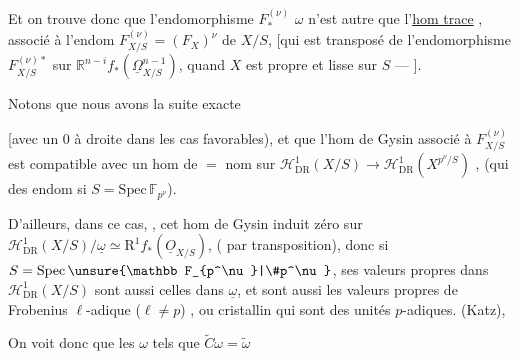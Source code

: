
Et on trouve donc que l'endomorphisme $F_*^{(\nu)}$  $\omega$ n'est autre que l'\uline{hom trace} , associé à l'endom $F_{X/S}^{(\nu)}=(F_X)^\nu$ de $X/S$, [qui est transposé de l'endomorphisme $F_{X/S}^{(\nu)*}$ sur $\mathbb R^{n-i}f_*(\underline\Omega^{n-1}_{X/S})$, quand $X$ est propre et lisse sur $S$ --- ].

 Notons que nous avons la suite exacte


[avec un $0$ à droite dans les cas favorables), et que l'hom de Gysin  associé à $F_{X/S}^{(\nu)}$ est compatible avec un hom de $=$ nom sur $\mathcal H^1_{\mathrm{DR}}(X/S)\longrightarrow\mathcal H^1_{\mathrm{DR}}(X^{p^\nu/S})$ , (qui  des endom si $S=\mathrm{Spec}\,\mathbb F_{p^\nu}$). 

D'ailleurs, dans ce cas,  , cet hom de Gysin induit zéro sur $\mathcal H^1_{\mathrm{DR}}(X/S)/\underline\omega\simeq\mathrm R^1 f_*(\underline O_{X/S})$,  ( par transposition), donc si $S=\mathrm{Spec}\,\unsure{\mathbb F_{p^\nu}|\#p^\nu}$, ses valeurs propres dans $\mathcal H^1_{\mathrm{DR}}(X/S)$  sont aussi celles dans $\underline\omega$, et   sont aussi les valeurs propres  de Frobenius $\ell$-adique ($\ell\ne p$) , ou cristallin qui sont des unités $p$-adiques. (Katz),

On voit donc que les $\omega$ tels que $\widetilde C\omega=\widetilde\omega$

